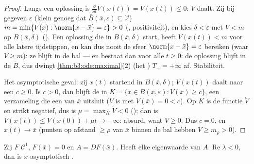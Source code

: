 \begin{proof}
Langs een oplossing is $\frac{\dd}{\dd t}V(x(t)) = \dot V(x(t))
\leq 0$: $V$ daalt. Zij bij gegeven $\varepsilon$ (klein genoeg
dat $\bar B(\bar x, \varepsilon) \subseteq \mathcal V$) $m =
\min\{V(x) : \norm{x - \bar x} = \varepsilon\} > 0$ (,
positiviteit), en kies $\delta < \varepsilon$ met $V < m$ op
$B(\bar x, \delta)$ (). Een oplossing die in $B(\bar
x, \delta)$ start, heeft $V(x(t)) < m$ voor alle latere
tijdstippen, en kan dus nooit de sfeer $\norm{x - \bar x} =
\varepsilon$ bereiken (waar $V \geq m$): ze blijft in de bal ---
en bestaat dan voor alle $t \geq 0$: de oplossing blijft in de
 $\bar B$, dus dwingt \cref{thm:b3:ode:maximal}(2) (het
) $T_+ = +\infty$ af.
Stabiliteit.

Het asymptotische geval: zij $x(t)$ startend in $B(\bar x,
\delta)$; $V(x(t))$ daalt naar een $c \geq 0$. Is $c > 0$, dan
blijft de  in $K = \{x \in \bar B(\bar x, \varepsilon): V(x)
\geq c\}$, een  verzameling die een  van $\bar x$
uitsluit ($V$ is  met $V(\bar x) = 0 < c$). Op $K$ is de
functie $\dot V$  en strikt negatief, dus is $\mu =
\max_K\dot V < 0$ (); dan is $V(x(t)) \leq V(x(0)) +
\mu t \to -\infty$: absurd, want $V \geq 0$. Dus $c = 0$, en
$x(t) \to \bar x$ (punten op afstand $\geq \rho$ van $\bar x$
binnen de bal hebben $V \geq m_\rho > 0$).
\end{proof}

\begin{theorem}
\label{thm:b3:ode:linearization}
Zij $F$ $\mathcal C^1$, $F(\bar x) = 0$ en $A = DF(\bar x)$.
Heeft elke eigenwaarde van $A$ $\operatorname{Re}\lambda < 0$,
dan is $\bar x$ asymptotisch .
\end{theorem}

